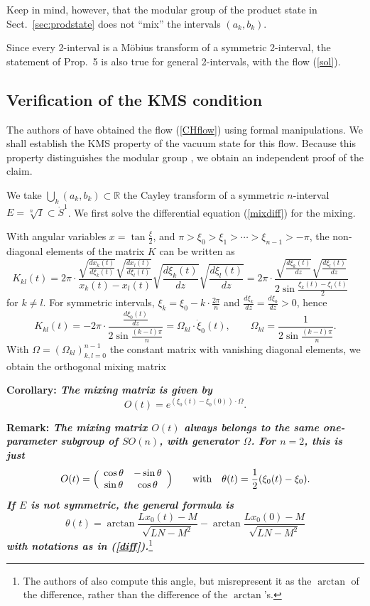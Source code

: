 \documentclass[12pt]{article}
\def \RR {{\mathbb R}}
\def \Sdot {\dot S^1}
\def\be{\begin{equation}} \def\bea{\begin{eqnarray}}
\def\ba{\begin{array}} \def\eea{\end{eqnarray}}
\def\ee{\end{equation}}\def\ea{\end{array}}
\newcommand{\dd}[2]{\frac{d{#2}}{d{#1}}}
\begin{document}
Keep in mind, however, that the modular group of the product state in
Sect.\ \ref{sec:prodstate} does not ``mix'' the intervals $(a_k,b_k)$. 

Since every 2-interval is a Möbius transform of a symmetric
2-interval, the statement of Prop.\ 5 is also true for general
2-intervals, with the flow (\ref{sol}). 







\subsection{Verification of the KMS condition}

The authors of \cite{CH} have obtained the flow (\ref{CHflow}) using
formal manipulations. We shall establish the KMS property of the
vacuum state for this flow. Because this property distinguishes the
modular group \cite{T}, we obtain an independent proof of the claim. 

We take $\bigcup_{k}(a_k,b_k)\subset \RR$ the Cayley transform
of a symmetric $n$-interval $E=\sqrt[n] I\subset \Sdot$. 
We first solve the differential equation (\ref{mixdiff}) for the
mixing. 

With angular variables $x=\tan\frac\xi2$, and $\pi > \xi_0 > \xi_1 >
\cdots > \xi_{n-1} > -\pi$, the non-diagonal elements of the matrix
$K$ can be written as 
\be
  K_{kl}(t) = 2\pi\cdot \frac{\sqrt{\dd {\xi_k(t)}{x_k(t)}} 
  \sqrt{\dd {\xi_l(t)}{x_l(t)}}}{x_k(t)-x_l(t)} 
  \sqrt{\textstyle\dd  z{\xi_k(t)}}  
  \sqrt{\textstyle\dd z {\xi_l(t)}} = 2\pi\cdot \frac{\sqrt{\dd z{\xi_k(t)}} 
  \sqrt{\dd z {\xi_l(t)}}}{2\sin\frac{\xi_k(t)-\xi_l(t)}2} \quad
\ee
for $k\neq l$. For symmetric intervals, 
$\xi_k= \xi_0-k\cdot\frac{2\pi}n$ and $\dd z{\xi_k} = \dd
z{\xi_0} >0$, hence 
\be
\label{omega}
  K_{kl}(t)=- 2\pi\cdot \frac{\dd z {\xi_0(t)}}{2\sin\frac{(k-l)\pi}n}
  = \Omega_{kl}\cdot \dot \xi_0(t), \qquad \Omega_{kl}=
  \frac{1}{2\sin\frac{(k-l)\pi}n}. 
\ee
With $\Omega=(\Omega_{kl})_{k,l=0}^{n-1}$ the constant matrix with
vanishing diagonal elements, we obtain the orthogonal mixing matrix 

\medskip 

{\bf Corollary: \sl The mixing matrix is given by} 
\be 
   O(t)=e^{(\xi_0(t)-\xi_0(0))\cdot \Omega}.
\ee

{\bf Remark: \sl The mixing matrix $O(t)$ always belongs to the same
  one-parameter subgroup of $SO(n)$, with generator $\Omega$. For
  $n=2$, this is just 
\be 
  O(t)=\Big(\ba{cc}\cos\theta & -\sin\theta \\
  \sin\theta & \cos\theta 
\ea\Big) \qquad\hbox{with}\quad \theta(t)=\frac 12(\xi_0(t)-\xi_0).
\ee
If $E$ is not symmetric, the general formula is 
\be
\label{angle}
  \theta(t) = \arctan\frac{Lx_0(t)-M}{\sqrt{LN-M^2}} -
  \arctan\frac{Lx_0(0)-M}{\sqrt{LN-M^2}}
\ee
with notations as in (\ref{diff}).}\footnote{The authors of \cite{CH}
  also compute this angle, but misrepresent it as the $\arctan$ of the
  difference, rather than the difference of the $\arctan$'s.}
\end{document}
